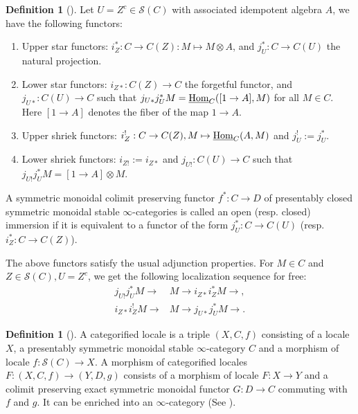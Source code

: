 \documentclass[a4paper,10pt]{amsart}
\theoremstyle{remark}
\theoremstyle{definition}
\newtheorem{definition}[theorem]{Definition}
\theoremstyle{plain}
\numberwithin{equation}{section}
\newcommand{\calS}{{\mathcal S}}
\newcommand{\Hom}{{\rm Hom}}
\begin{document}
\begin{definition}[{\cite[Def.~2.2.2]{camargo2024analytic}}]\label{openclosed}
	Let $U=Z^c\in \calS(C)$ with associated idempotent algebra $A$, we have the following functors:
	\begin{enumerate}
		\item Upper star functors: $i_Z^*: C\to C(Z): M\mapsto M\otimes A$, and $j_U^*:C\to C(U)$ the natural projection.
		\item Lower star functors: $i_{Z*}:C(Z)\to C$ the forgetful functor, and $j_{U*}:C(U)\to C$ such that $j_{U*}j^*_UM=\underline{\Hom}_C([1\to A],M)$ for all $M\in C$. Here $[1\rightarrow A]$ denotes the fiber of the map $1\rightarrow A$.
		\item Upper shriek functors: $i^!_Z:C\to C(Z),M\mapsto \underline{\Hom}_C(A,M)$ and $j_U^!:=j_U^*$.
		\item Lower shriek functors:  $i_{Z!}:=i_{Z*}$ and $j_{U!}:C(U)\to C$ such that $j_{U!}j_U^*M=[1\to A]\otimes M$.
	\end{enumerate}	
	A symmetric monoidal colimit preserving functor $f^*:C\to D$ of presentably closed symmetric monoidal stable $\infty$-categories is called an open (resp. closed) immersion if it is equivalent to a functor of the form $j_U^*:C\to C(U)$ (resp. $i_Z^*:C\to C(Z)$).
\end{definition}
The above functors satisfy the usual adjunction properties. For $M\in C$ and $Z\in \calS(C), U=Z^c$, we get the following localization sequence for free:
\begin{equation}\label{localizationsequence}
	\begin{aligned}
		j_{U!}j_{U}^*M\to &M\to i_{Z*}i_Z^*M\to,\\
		i_{Z*}i_Z^!M\to &M\to j_{U*}j_U^*M\to.
	\end{aligned}
\end{equation}

\begin{definition}[{\cite[Def.~7.1]{scholze2022complex}}]
	A categorified locale is a triple $(X,C,f)$ consisting of a locale $X$, a presentably symmetric monoidal stable $\infty$-category $C$ and a morphism of locale $f:\calS(C)\to X$. A morphism of categorified locales $F:(X,C,f)\to (Y,D,g)$ consists of a morphism of locale $F:X\to Y$ and a colimit preserving exact symmetric monoidal functor $G:D\to C$ commuting with $f$ and $g$. It can be enriched into an $\infty$-category (See \cite[Def.~4.2]{aoki2025sheavesspectrumadjunction}).
\end{definition}
\end{document}
